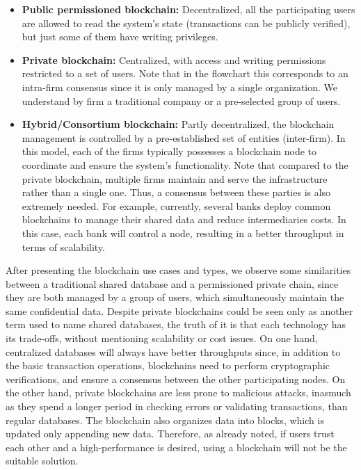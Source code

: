 \begin{itemize}
	\item \textbf{Public permissioned blockchain:} Decentralized, all the participating users are allowed to read the system's state (transactions can be publicly verified), but just some of them have writing privileges.
	\item \textbf{Private blockchain:} Centralized, with access and writing permissions restricted to a set of users. Note that in the flowchart this corresponds to an intra-firm consensus since it is only managed by a single organization. We understand by firm a traditional company or a pre-selected group of users.
	\item \textbf{Hybrid/Consortium blockchain:} Partly decentralized, the blockchain management is controlled by a pre-established set of entities (inter-firm). In this model, each of the firms typically possesses a blockchain node to coordinate and ensure the system's functionality. Note that compared to the private blockchain, multiple firms maintain and serve the infrastructure rather than a single one. Thus, a consensus between these parties is also extremely needed. For example, currently, several banks deploy common blockchains to manage their shared data and reduce intermediaries costs. In this case, each bank will control a node, resulting in a better throughput in terms of scalability.
\end{itemize}

After presenting the blockchain use cases and types, we observe some similarities between a traditional shared database and a permissioned private chain, since they are both managed by a group of users, which simultaneously maintain the same confidential data. Despite private blockchains could be seen only as another term used to name shared databases, the truth of it is that each technology has its trade-offs, without mentioning scalability or cost issues. On one hand, centralized databases will always have better throughputs since, in addition to the basic transaction operations, blockchains need to perform cryptographic verifications, and ensure a consensus between the other participating nodes. On the other hand, private blockchains are less prone to malicious attacks, inasmuch as they spend a longer period in checking errors or validating transactions, than regular databases. The blockchain also organizes data into blocks, which is updated only appending new data. Therefore, as already noted, if users trust each other and a high-performance is desired, using a blockchain will not be the suitable solution.

